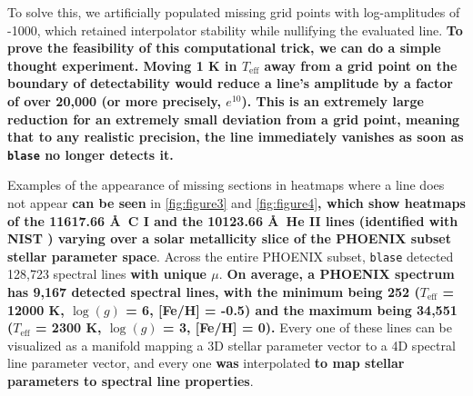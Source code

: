 \documentclass[twocolumn, linenumbers]{aastex631}
\begin{document}
To solve this, we artificially populated missing grid points with log-amplitudes of -1000, which retained interpolator stability while nullifying the evaluated line.
\textbf{To prove the feasibility of this computational trick, we can do a simple thought experiment.
Moving 1 K in $T_\text{eff}$ away from a grid point on the boundary of detectability would reduce a line's amplitude by a factor of over 20,000 (or more precisely, $e^{10}$).
This is an extremely large reduction for an extremely small deviation from a grid point, meaning that to any realistic precision, the line immediately vanishes as soon as \texttt{blase} no longer detects it.}

Examples of the appearance of missing sections in heatmaps where a line does not appear \textbf{can be seen} in \autoref{fig:figure3} and \autoref{fig:figure4}\textbf{, which show heatmaps of the 11617.66 \AA \ C I and the 10123.66 \AA \ He II lines (identified with NIST \citep{NIST}) varying over a solar metallicity slice of the PHOENIX subset stellar parameter space}.
Across the entire PHOENIX subset, \texttt{blase} detected 128,723 spectral lines \textbf{with unique $\mu$}.
\textbf{On average, a PHOENIX spectrum has 9,167 detected spectral lines, with the minimum being 252 ($T_\text{eff}$ = 12000 K, $\log(g)$ = 6, [Fe/H] = -0.5) and the maximum being 34,551 ($T_\text{eff}$ = 2300 K, $\log(g)$ = 3, [Fe/H] = 0).}
Every one of these lines can be visualized as a manifold mapping a 3D stellar parameter vector to a 4D spectral line parameter vector, and every one \textbf{was} interpolated \textbf{to map stellar parameters to spectral line properties}.
\end{document}
